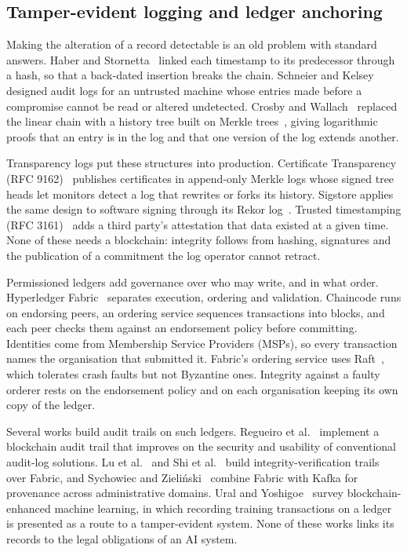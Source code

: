 \subsection{Tamper-evident logging and ledger anchoring}

Making the alteration of a record detectable is an old problem with standard answers. Haber and Stornetta~\cite{haber1991} linked each timestamp to its predecessor through a hash, so that a back-dated insertion breaks the chain. Schneier and Kelsey~\cite{schneier1999} designed audit logs for an untrusted machine whose entries made before a compromise cannot be read or altered undetected. Crosby and Wallach~\cite{crosby2009} replaced the linear chain with a history tree built on Merkle trees~\cite{merkle1987}, giving logarithmic proofs that an entry is in the log and that one version of the log extends another.

Transparency logs put these structures into production. Certificate Transparency (RFC 9162)~\cite{rfc9162} publishes certificates in append-only Merkle logs whose signed tree heads let monitors detect a log that rewrites or forks its history. Sigstore applies the same design to software signing through its Rekor log~\cite{newman2022}. Trusted timestamping (RFC 3161)~\cite{rfc3161} adds a third party's attestation that data existed at a given time. None of these needs a blockchain: integrity follows from hashing, signatures and the publication of a commitment the log operator cannot retract.

Permissioned ledgers add governance over who may write, and in what order. Hyperledger Fabric~\cite{androulaki2018} separates execution, ordering and validation. Chaincode runs on endorsing peers, an ordering service sequences transactions into blocks, and each peer checks them against an endorsement policy before committing. Identities come from Membership Service Providers (MSPs), so every transaction names the organisation that submitted it. Fabric's ordering service uses Raft~\cite{ongaro2014}, which tolerates crash faults but not Byzantine ones. Integrity against a faulty orderer rests on the endorsement policy and on each organisation keeping its own copy of the ledger.

Several works build audit trails on such ledgers. Regueiro et al.~\cite{regueiro2021} implement a blockchain audit trail that improves on the security and usability of conventional audit-log solutions. Lu et al.~\cite{lu2020} and Shi et al.~\cite{shi2022} build integrity-verification trails over Fabric, and Sychowiec and Zieliński~\cite{sychowiec2025} combine Fabric with Kafka for provenance across administrative domains. Ural and Yoshigoe~\cite{ural2023} survey blockchain-enhanced machine learning, in which recording training transactions on a ledger is presented as a route to a tamper-evident system. None of these works links its records to the legal obligations of an AI system.

